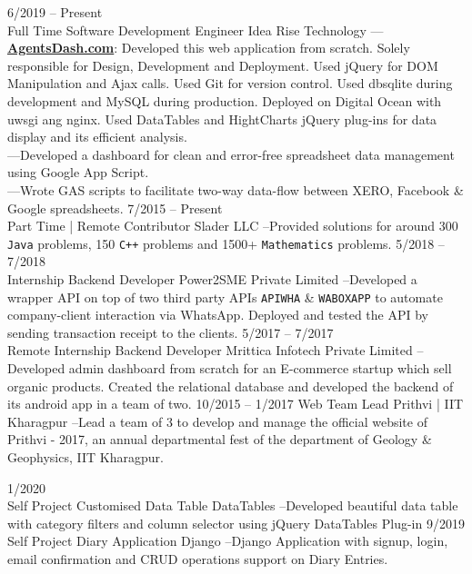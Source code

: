 \documentclass[8pt]{developercv} %
\begin{document}
\begin{entrylist}
	\entry
		{6/2019 -- Present\\\footnotesize{Full Time}}
		{Software Development Engineer}
		{Idea Rise Technology}
		{---\href{https://agentsdash.com}{\textbf{AgentsDash.com}}: Developed this web application from scratch. Solely responsible for Design, Development and Deployment. Used jQuery for DOM Manipulation and Ajax calls. Used Git for version control. Used dbsqlite during development and MySQL during production. Deployed on Digital Ocean with uwsgi ang nginx. Used DataTables and HightCharts jQuery plug-ins for data display and its efficient analysis.\\ ---Developed a dashboard for clean and error-free spreadsheet data management using Google App Script.\\ ---Wrote GAS scripts to facilitate two-way data-flow between XERO, Facebook \& Google spreadsheets.}
	\entry
		{7/2015 -- Present\\\footnotesize{Part Time | Remote}}
		{Contributor}
		{Slader LLC}
		{--Provided solutions for around 300 \texttt{Java} problems, 150 \texttt{C++} problems and 1500+ \texttt{Mathematics} problems.}
	\entry
		{5/2018 -- 7/2018\\\footnotesize{Internship}}
		{Backend Developer}
		{Power2SME Private Limited}
		{--Developed a wrapper API on top of two third party APIs \texttt{APIWHA} \& \texttt{WABOXAPP} to automate company-client interaction via WhatsApp. Deployed and tested the API by sending transaction receipt to the clients.}
	\entry
		{5/2017 -- 7/2017\\\footnotesize{Remote Internship}}
		{Backend Developer}
		{Mrittica Infotech Private Limited}
		{--Developed admin dashboard from scratch for an E-commerce startup which sell organic products. Created the relational database and developed the backend of its android app in a team of two.}
	\entry
		{10/2015 -- 1/2017}
		{Web Team Lead}
		{Prithvi | IIT Kharagpur}
		{--Lead a team of 3 to develop and manage the official website of Prithvi - 2017, an annual departmental fest of the department of Geology \& Geophysics, IIT Kharagpur.}
\end{entrylist}
\begin{entrylist}
	\entry
		{1/2020 \\\footnotesize{Self Project}}
		{Customised Data Table}
		{DataTables}
		{--Developed beautiful data table with category filters and column selector using jQuery DataTables Plug-in}
	\entry
		{9/2019 \\\footnotesize{Self Project}}
		{Diary Application}
		{Django}
		{--Django Application with signup, login, email confirmation and CRUD operations support on Diary Entries.}
\end{entrylist}
\end{document}
